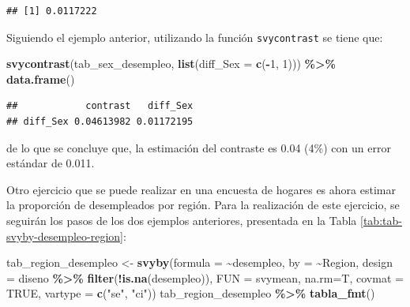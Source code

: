 \documentclass[
  spanish,
  12pt,
]{book}
\newenvironment{Shaded}{\begin{snugshade}}{\end{snugshade}}
\newcommand{\AttributeTok}[1]{\textcolor[rgb]{0.13,0.29,0.53}{#1}}
\newcommand{\ConstantTok}[1]{\textcolor[rgb]{0.56,0.35,0.01}{#1}}
\newcommand{\DecValTok}[1]{\textcolor[rgb]{0.00,0.00,0.81}{#1}}
\newcommand{\FunctionTok}[1]{\textcolor[rgb]{0.13,0.29,0.53}{\textbf{#1}}}
\newcommand{\NormalTok}[1]{#1}
\newcommand{\OtherTok}[1]{\textcolor[rgb]{0.56,0.35,0.01}{#1}}
\newcommand{\SpecialCharTok}[1]{\textcolor[rgb]{0.81,0.36,0.00}{\textbf{#1}}}
\newcommand{\StringTok}[1]{\textcolor[rgb]{0.31,0.60,0.02}{#1}}
\begin{document}
\begin{verbatim}
## [1] 0.0117222
\end{verbatim}

Siguiendo el ejemplo anterior, utilizando la función \texttt{svycontrast} se tiene que:

\begin{Shaded}
\begin{Highlighting}[]
\FunctionTok{svycontrast}\NormalTok{(tab\_sex\_desempleo,}
            \FunctionTok{list}\NormalTok{(}\AttributeTok{diff\_Sex =} \FunctionTok{c}\NormalTok{(}\SpecialCharTok{{-}}\DecValTok{1}\NormalTok{, }\DecValTok{1}\NormalTok{))) }\SpecialCharTok{\%\textgreater{}\%}
  \FunctionTok{data.frame}\NormalTok{()}
\end{Highlighting}
\end{Shaded}

\begin{verbatim}
##            contrast   diff_Sex
## diff_Sex 0.04613982 0.01172195
\end{verbatim}

de lo que se concluye que, la estimación del contraste es 0.04 (4\%) con un error estándar de 0.011.

Otro ejercicio que se puede realizar en una encuesta de hogares es ahora estimar la proporción de desempleados por región. Para la realización de este ejercicio, se seguirán los pasos de los dos ejemplos anteriores, presentada en la Tabla \ref{tab:tab-svyby-desempleo-region}:

\begin{Shaded}
\begin{Highlighting}[]
\NormalTok{tab\_region\_desempleo }\OtherTok{\textless{}{-}} \FunctionTok{svyby}\NormalTok{(}\AttributeTok{formula =}  \SpecialCharTok{\textasciitilde{}}\NormalTok{desempleo, }\AttributeTok{by =} \SpecialCharTok{\textasciitilde{}}\NormalTok{Region,}
                              \AttributeTok{design  =}\NormalTok{ diseno }\SpecialCharTok{\%\textgreater{}\%} \FunctionTok{filter}\NormalTok{(}\SpecialCharTok{!}\FunctionTok{is.na}\NormalTok{(desempleo)),}
                              \AttributeTok{FUN     =}\NormalTok{ svymean, }\AttributeTok{na.rm=}\NormalTok{T, }\AttributeTok{covmat =} \ConstantTok{TRUE}\NormalTok{,}
                              \AttributeTok{vartype =} \FunctionTok{c}\NormalTok{(}\StringTok{"se"}\NormalTok{, }\StringTok{"ci"}\NormalTok{))}
\NormalTok{tab\_region\_desempleo }\SpecialCharTok{\%\textgreater{}\%}
  \FunctionTok{tabla\_fmt}\NormalTok{()}
\end{Highlighting}
\end{Shaded}
\end{document}
